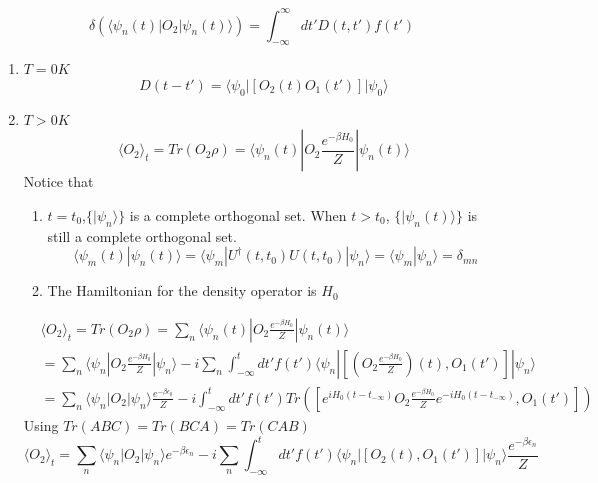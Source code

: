 \documentclass[a4paper,11pt]{article}
\begin{document}
\begin{equation*}
  \delta(\langle\psi_n(t)|O_2|\psi_n(t)\rangle)=\int_{-\infty}^{\infty}dt'D(t,t')f(t')
\end{equation*}
\begin{enumerate}
  \item $T=0K$
  \begin{equation*}
    D(t-t')=\langle\psi_0|\left[O_2(t)O_1(t')\right]|\psi_0\rangle
  \end{equation*}
  \item $T>0K$
  \begin{equation*}
    \langle O_2\rangle_t=Tr(O_2\rho)=\langle\psi_n(t)|O_2\frac{e^{-\beta H_0}}{Z}|\psi_n(t)\rangle
  \end{equation*}
  Notice that
  \begin{enumerate}[(1)]
    \item $t=t_0$,$\{|\psi_n\rangle\}$ is a complete orthogonal set. When $t>t_0$, $\{|\psi_n(t)\rangle\}$ is still a complete orthogonal set.
    \begin{equation*}
      \langle\psi_m(t)|\psi_n(t)\rangle=\langle\psi_m|U^\dag(t,t_0)U(t,t_0)|\psi_n\rangle=\langle\psi_m|\psi_n\rangle=\delta_{mn}
    \end{equation*}
    \item The Hamiltonian for the density operator is $H_0$
  \end{enumerate}
  \begin{equation*}
    \begin{split}
       &\langle O_2\rangle_t=Tr(O_2\rho)=\sum_{n}\langle\psi_n(t)|O_2\frac{e^{-\beta H_0}}{Z}|\psi_n(t)\rangle\\
         &=\sum_{n}\langle\psi_n|O_2\frac{e^{-\beta H_0}}{Z}|\psi_n\rangle-i\sum_{n}\int_{-\infty}^{t}dt'f(t')\langle\psi_n|\left[\left(O_2\frac{e^{-\beta H_0}}{Z}\right)(t),O_1(t')\right]|\psi_n\rangle\\
         &=\sum_{n}\langle\psi_n|O_2|\psi_n\rangle\frac{e^{-\beta \epsilon_0}}{Z}-i\int_{-\infty}^{t}dt'f(t')Tr\left(\left[e^{iH_0(t-t_{-\infty})}O_2\frac{e^{-\beta H_0}}{Z}e^{-iH_0(t-t_{-\infty})},O_1(t')\right]\right)
    \end{split}
  \end{equation*}
  Using $Tr(ABC)=Tr(BCA)=Tr(CAB)$
  \begin{equation*}
    \langle O_2\rangle_t=\sum_{n}\langle\psi_n|O_2|\psi_n\rangle e^{-\beta\epsilon_n}-i\sum_{n}\int_{-\infty}^{t}dt'f(t')\langle\psi_n|\left[O_2(t),O_1(t')\right]|\psi_n\rangle\frac{e^{-\beta\epsilon_n}}{Z}
  \end{equation*}

\end{enumerate}
\end{document}
